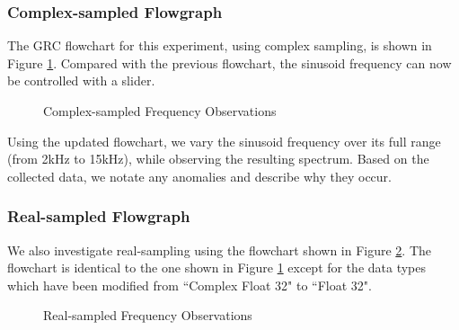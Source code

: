 \documentclass{article}
\begin{document}
 
\subsubsection{Complex-sampled Flowgraph \label{subsection::frequency_observations_complex_sampling}}

The GRC flowchart for this experiment, using complex sampling, is shown in Figure \ref{fig::frequency_observations_complex_sampling}. Compared with the previous flowchart, the sinusoid frequency can now be controlled with a slider.

\begin{figure}[H]
	\centerline{}
	\caption{Complex-sampled Frequency Observations}
	\label{fig::frequency_observations_complex_sampling}
\end{figure}

Using the updated flowchart, we vary the sinusoid frequency over its full range (from 2kHz to 15kHz), while observing the resulting spectrum. Based on the collected data, we notate any anomalies and describe why they occur. 

\subsubsection{Real-sampled Flowgraph}

We also investigate real-sampling using the flowchart shown in Figure \ref{fig::frequency_observations_real_sampling}. The flowchart is identical to the one shown in Figure \ref{fig::frequency_observations_complex_sampling} except for the data types which have been modified from ``Complex Float 32" to ``Float 32".

\begin{figure}[H]
	\centerline{}
	\caption{Real-sampled Frequency Observations}
	\label{fig::frequency_observations_real_sampling}
\end{figure}
\end{document}
